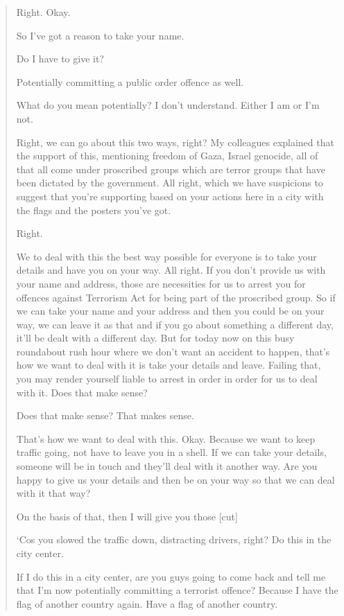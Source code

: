 \begin{quote}
    Right. Okay.
    
    So I've got a reason to take your name.
    
    Do I have to give it?
    
    Potentially committing a public order offence as well.
    
    What do you mean potentially? I don't understand. Either I am or I'm not.
    
    Right, we can go about this two ways, right? My colleagues explained that the support of this, mentioning freedom of Gaza, Israel genocide, all of that all come under proscribed groups which are terror groups that have been dictated by the government. All right, which we have suspicions to suggest that you're supporting based on your actions here in a city with the flags and the posters you've got.
    
    Right.
    
    We to deal with this the best way possible for everyone is to take your details and have you on your way. All right. If you don't provide us with your name and address, those are necessities for us to arrest you for offences against Terrorism Act for being part of the proscribed group. So if we can take your name and your address and then you could be on your way, we can leave it as that and if you go about something a different day, it'll be dealt with a different day. But for today now on this busy roundabout rush hour where we don't want an accident to happen, that's how we want to deal with it is take your details and leave. Failing that, you may render yourself liable to arrest in order in order for us to deal with it. Does that make sense?
    
    Does that make sense? That makes sense.
    
    That's how we want to deal with this. Okay. Because we want to keep traffic going, not have to leave you in a shell. If we can take your details, someone will be in touch and they'll deal with it another way. Are you happy to give us your details and then be on your way so that we can deal with it that way?
    
    On the basis of that, then I will give you those [cut]
    
    ‘Cos you slowed the traffic down, distracting drivers, right? Do this in the city center.
    
    If I do this in a city center, are you guys going to come back and tell me that I'm now potentially committing a terrorist offence? Because I have the flag of another country again. Have a flag of another country.
    

\end{quote}
